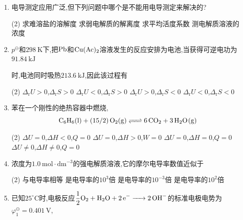 \begin{enumerate}[label=\arabic*., itemsep=1.5ex]
    则$\ce{B}$的活度$a_x(\ce{B})$为
    \begin{tasks}(4)
        \task $0.65$
        \task $0.7$
        \task $0.8$
        \task $0.56$
    \end{tasks}
    \item 电导测定应用广泛,但下列问题中哪个是不能用电导测定来解决的?
    \begin{tasks}(2)
        \task 求难溶盐的溶解度
        \task 求弱电解质的解离度
        \task 求平均活度系数
        \task 测电解质溶液的浓度
    \end{tasks}
    \item $p^\ominus$和$298\ \mathrm{K}$下,把$\ce{Pb}$和$\ce{Cu(Ac)2}$溶液发生的反应安排为电池,当获得可逆电功为$91.84\ \mathrm{kJ}$
    
    时,电池同时吸热$213.6\ \mathrm{kJ}$,因此该过程有
    \begin{tasks}(2)
        \task $\Delta_\mathrm{r}U>0$,$\Delta_\mathrm{r}S>0$
        \task $\Delta_\mathrm{r}U<0$,$\Delta_\mathrm{r}S>0$
        \task $\Delta_\mathrm{r}U>0$,$\Delta_\mathrm{r}S<0$
        \task $\Delta_\mathrm{r}U<0$,$\Delta_\mathrm{r}S<0$
    \end{tasks}
    \item 苯在一个刚性的绝热容器中燃烧,
    \[
    \ce{C6H6(l) + (15/2)O2(g) <=> 6CO2 + 3H2O(g)}
    \]
    \begin{tasks}(2)
        \task $\Delta U=0$,\quad $\Delta H<0$,\quad $Q=0$
        \task $\Delta U=0$,\quad $\Delta H>0$,\quad $W=0$
        \task $\Delta U=0$,\quad $\Delta H=0$,\quad $Q=0$
        \task $\Delta U\neq0$,\quad $\Delta H\neq0$,\quad $Q=0$
    \end{tasks}
    \item 浓度为$1.0\ \mathrm{mol\cdot dm^{-3}}$的强电解质溶液,它的摩尔电导率数值近似于
    \begin{tasks}(2)
        \task 与电导率相等
        \task 是电导率的$10^3$倍
        \task 是电导率的$10^{-3}$倍
        \task 是电导率的$10^2$倍
    \end{tasks}
    \item 已知$25^\circ\mathrm{C}$时,电极反应$\displaystyle \frac{1}{2}\ce{O2 + H2O + 2e^- -> 2OH^-}$的标准电极电势为$\varphi_1^\ominus=0.401\ \mathrm{V}$,
    

\end{enumerate}
